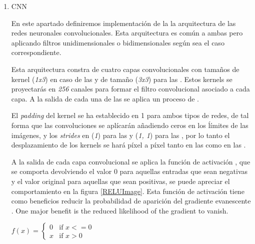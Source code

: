 \begin{enumerate}
\begin{enumerate}
                \item CNN

                    En este apartado definiremos implementación de la la arquitectura de las redes neuronales convolucionales. Esta arquitectura es común a ambas pero aplicando filtros unidimensionales o bidimensionales según sea el caso correspondiente.

                    Esta arquitectura constra de cuatro capas convolucionales con tamaños de kernel (\textit{1x3}) en caso de las  y de tamaño (\textit{3x3}) para las . Estos kernels se proyectarás en \textit{256} canales para formar el filtro convolucional asociado a cada capa. A la salida de cada una de las se aplica un proceso de .

                    El \textit{padding} del kernel se ha establecido en 1 para ambos tipos de redes, de tal forma que las convoluciones se aplícarán añadiendo ceros en los ĺímites de las imágenes, y los \textit{strides} en (\textit{1}) para las  y (\textit{1, 1}) para las , por lo tanto el desplazamiento de los kernels se hará píxel a píxel tanto en las  como en las .

                    A la salida de cada capa convolucional se aplica la función de activación , que se comporta devolviendo el valor $0$ para aquellas entradas que sean negativas y el valor original para aquellas que sean positivas, se puede apreciar el comportamiento en la figura \ref{RELUImage}. Esta función de activación tiene como beneficios reducir la probabilidad de aparición del gradiente evanescente \cite{GradientVanishingRelu}.
                    One major benefit is the reduced likelihood of the gradient to vanish. 

                    \begin{center}
                        $f(x) = \left\{
                                       \begin{array}{lr}
                                         0 & \text{if } x<=0\\
                                         x & \text{if } x>0
                                       \end{array}
                                \right.$
                    \end{center}


\end{enumerate}
\end{enumerate}
